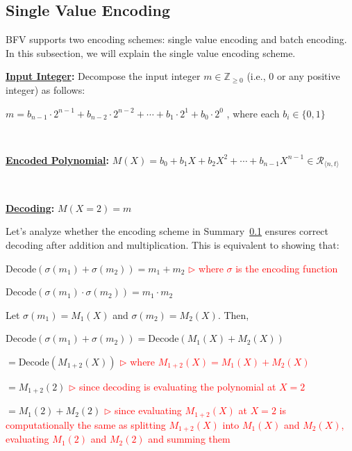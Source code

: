 \clearpage

\subsection{Single Value Encoding}
\label{subsec:bfv-single-encoding}

BFV supports two encoding schemes: single value encoding and batch encoding. In this subsection, we will explain the single value encoding scheme. 



\begin{tcolorbox}[title={\textbf{\tboxlabel{\ref*{subsec:bfv-single-encoding}} BFV Encoding}}]

\textbf{\underline{Input Integer}:} Decompose the input integer $m \in \mathbb{Z}_{\geq 0}$ (i.e., 0 or any positive integer) as follows:

$m = b_{n-1}\cdot 2^{n-1} + b_{n-2}\cdot 2^{n-2} + \cdots + b_1\cdot 2^1 + b_0\cdot 2^0$  \text { } , where each $b_i \in \{0, 1\}$

$ $


\textbf{\underline{Encoded Polynomial}:} $M(X) = b_0 + b_1X + b_2X^2 + \cdots + b_{n-1}X^{n-1} \in \mathcal{R}_{\langle n, t\rangle}$

$ $

\textbf{\underline{Decoding}:} $M(X=2) = m$

\end{tcolorbox}


Let's analyze whether the encoding scheme in Summary~\ref*{subsec:bfv-single-encoding} ensures correct decoding after addition and multiplication. This is equivalent to showing that:

$\text{Decode}(\sigma(m_1) + \sigma(m_2)) = m_1 + m_2$ \textcolor{red}{$\rhd$ where $\sigma$ is the encoding function}

$\text{Decode}(\sigma(m_1) \cdot \sigma(m_2)) = m_1 \cdot m_2$

Let $\sigma(m_1) = M_1(X)$ and $\sigma(m_2) = M_2(X)$. Then, 

$\text{Decode}(\sigma(m_1) + \sigma(m_2)) = \text{Decode}(M_1(X) + M_2(X))$


$= \text{Decode}(M_{1+2}(X))$ \textcolor{red}{$\rhd$ where $M_{1+2}(X) = M_1(X) + M_2(X)$}

$= M_{1+2}(2)$ \textcolor{red}{$\rhd$ since decoding is evaluating the polynomial at $X = 2$}

$= M_{1}(2) + M_{2}(2)$ \textcolor{red}{$\rhd$ since evaluating $M_{1+2}(X)$ at $X=2$ is computationally the same as splitting $M_{1+2}(X)$ into $M_{1}(X)$ and $M_{2}(X)$, evaluating $M_1(2)$ and $M_2(2)$ and summing them}

